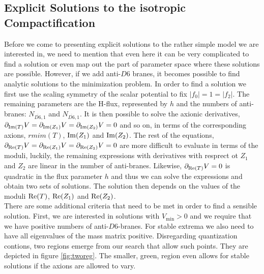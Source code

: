 \documentclass[12pt]{report}
\def\rmre{{\rm Re}}
\def\rmim{{\rm Im}}
\begin{document}
\subsection{Explicit Solutions to the isotropic Compactification}
Before we come to presenting explicit solutions to the rather simple model we are interested in, we need to mention that even here it can be very complicated to find a solution or even map out the part of parameter space where these solutions are possible. However, if we add anti-$D6$ branes, it becomes possible to find analytic solutions to the minimization problem. In order to find a solution we first use the scaling symmetry of the scalar potential to fix $|f_0| = 1 = |f_2|$. The remaining parameters are the H-flux, represented by $h$ and the numbers of anti-branes: $N_{\overline{D6},1}$ and $N_{\overline{D6},1}$. It is then possible to solve the axionic derivatives, $\partial_{\rmim(T)} V = \partial_{\rmim(Z_1)} V = \partial_{\rmim(Z_2)} V= 0$ and so on, in terms of the corresponding axions, $rmim(T)$, $\rmim(Z_1)$ and $\rmim(Z_2)$. The rest of the equations, $\partial_{\rmre(T)} V = \partial_{\rmre(Z_1)} V = \partial_{\rmre(Z_2)} V=0$ are more difficult to evaluate in terms of the moduli, luckily, the remaining expressions with derivatives with resprect ot $Z_1$ and $Z_2$ are linear in the number of anti-branes. Likewise, $\partial_{\rmre(T)} V = 0$ is quadratic in the flux parameter $h$ and thus we can solve the expressions and obtain two sets of solutions. The solution then depends on the values of the moduli $\rmre(T)$, $\rmre(Z_1)$ and $\rmre(Z_2)$.\\
There are some additional criteria that need to be met in order to find a sensible solution. First, we are interested in solutions with $V_{\text{min}} >0$ and we require that we have positive numbers of anti-$D6$-branes. For stable extrema we also need to have all eigenvalues of the mass matrix positive. Disregarding quantization contions, two regions emerge from our search that allow such points. They are depicted in figure \ref{fig:tworeg}. The smaller, green, region even allows for stable solutions if the axions are allowed to vary.
\end{document}
